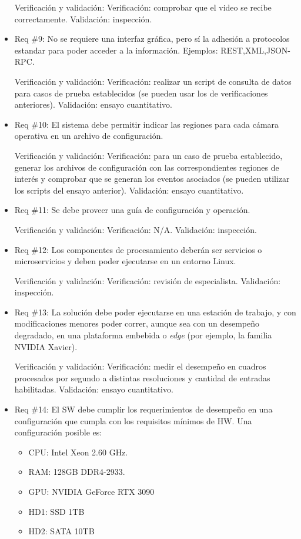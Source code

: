 \documentclass[11pt]{charter}
\begin{document}
\begin{itemize}
Verificación y validación:
\subitem Verificación: comprobar que el video se recibe correctamente.
\subitem Validación: inspección.

\item Req \#9: No se requiere una interfaz gráfica, pero sí la adhesión a protocolos estandar para poder acceder a la información. Ejemplos: REST,XML,JSON-RPC. 

Verificación y validación:
\subitem Verificación: realizar un script de consulta de datos para casos de prueba establecidos (se pueden usar los de verificaciones anteriores).
\subitem Validación: ensayo cuantitativo.

\item Req \#10: El sistema debe permitir indicar las regiones para cada cámara operativa en un archivo de configuración.

Verificación y validación:
\subitem Verificación: para un caso de prueba establecido, generar los archivos de configuración con las correspondientes regiones de interés y comprobar que se generan los eventos asociados (se pueden utilizar los scripts del ensayo anterior).
\subitem Validación: ensayo cuantitativo.

\item Req \#11: Se debe proveer una guía de configuración y operación.

Verificación y validación:
\subitem Verificación: N/A.
\subitem Validación: inspección.

\item Req \#12: Los componentes de procesamiento deberán ser servicios o microservicios y deben poder ejecutarse en un entorno Linux.

Verificación y validación:
\subitem Verificación: revisión de especialista.
\subitem Validación: inspección.

\item Req \#13: La solución debe poder ejecutarse en una estación de trabajo, y con modificaciones menores poder correr, aunque sea con un desempeño degradado, en una plataforma embebida o {\em edge} (por ejemplo, la familia NVIDIA Xavier).

Verificación y validación:
\subitem Verificación: medir el desempeño en cuadros procesados por segundo a distintas resoluciones y cantidad de entradas habilitadas.
\subitem Validación: ensayo cuantitativo.

\item Req \#14: El SW debe cumplir los requerimientos de desempeño en una configuración que cumpla con los requisitos mínimos de HW. Una configuración posible es:
	\begin{itemize}
		\item CPU: Intel Xeon 2.60 GHz.
		\item RAM: 128GB  DDR4-2933.
		\item GPU: NVIDIA GeForce RTX 3090
		\item HD1: SSD 1TB
		\item HD2: SATA 10TB
	\end{itemize}


\end{itemize}
\end{document}
